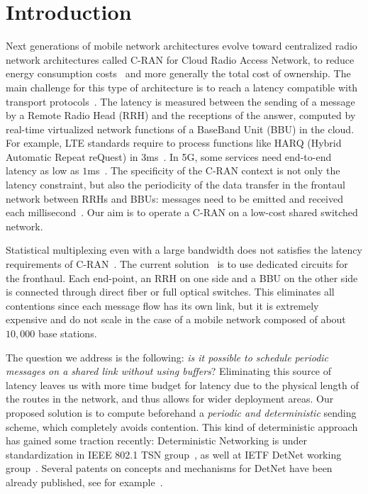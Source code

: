 \documentclass[10pt, conference, letterpaper]{IEEEtran}
\begin{document}
\section{Introduction}

Next generations of mobile network architectures evolve toward centralized radio network architectures called C-RAN for Cloud Radio Access Network, to reduce energy consumption costs~\cite{mobile2011c} and more generally the total cost of ownership. The main challenge for this type of architecture is to reach a latency compatible with transport protocols~\cite{ieeep802}. The latency is measured between the sending of a message by a Remote Radio Head (RRH) and the receptions of the answer, computed by real-time virtualized network functions of a BaseBand Unit (BBU) in the cloud. For example, LTE standards require to process functions like HARQ (Hybrid Automatic Repeat reQuest) in $3$ms~\cite{bouguen2012lte}. In 5G, some services need end-to-end latency as low as $1$ms~\cite{3gpp5g,boccardi2014five}. The specificity of the C-RAN context is not only the latency constraint, but also the periodicity of the data transfer in the frontaul network between RRHs and BBUs: messages need to be emitted and received each millisecond~\cite{bouguen2012lte}. Our aim is to operate a C-RAN on a low-cost shared switched network. 

 Statistical multiplexing even with a large bandwidth does not satisfies the latency requirements of C-RAN~\cite{dominique2018deterministic,barth2018deterministic}. The current solution~\cite{pizzinat2015things,tayq2017real} is to use dedicated circuits for the fronthaul. Each end-point, an RRH on one side and a BBU on the other side is connected through direct fiber or full optical switches. This eliminates all contentions since each message flow has its own link, but it is extremely expensive and do not scale in the case of a mobile network composed of about $10,000$ base stations. 

The question we address is the following: \emph{is it possible to schedule periodic messages on a shared link without using buffers}? Eliminating this source of latency leaves us with more time budget for latency due to the physical length of the routes in the network, and thus allows for wider deployment areas. Our proposed solution is to compute beforehand a \emph{periodic and deterministic} sending scheme, which completely avoids contention. This kind of deterministic approach has gained some traction recently: Deterministic Networking is under standardization in IEEE 802.1 TSN group~\cite{finn-detnet-architecture-08}, as well at IETF DetNet working group~\cite{ieee802}. Several patents on concepts and mechanisms for DetNet have been already published, see for example~\cite{howe2005time,leclerc2016transmission}. 
\end{document}

